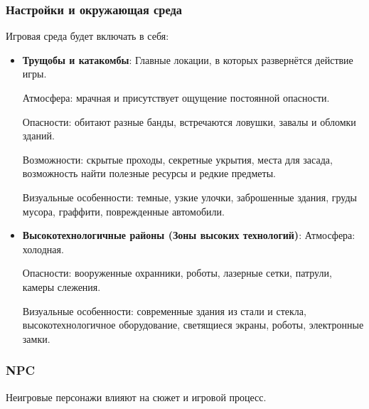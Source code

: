 \documentclass{article}
\begin{document}
\subsubsection{Настройки и окружающая среда}
Игровая среда будет включать в себя:
\begin{itemize}
    \item \textbf{Трущобы и катакомбы}: Главные локации, в которых развернётся действие игры. 
    
    Атмосфера: мрачная и присутствует ощущение постоянной опасности.

    Опасности: обитают разные банды, встречаются ловушки, завалы и обломки зданий.

    Возможности: скрытые проходы, секретные укрытия, места для засада, возможность найти полезные ресурсы и редкие предметы.

    Визуальные особенности: темные, узкие улочки, заброшенные здания, груды мусора, граффити, поврежденные автомобили.
    \item \textbf{Высокотехнологичные районы (Зоны высоких технологий)}:  
    Атмосфера: холодная. 

    Опасности: вооруженные охранники, роботы, лазерные сетки, патрули, камеры слежения.

    Визуальные особенности: современные здания из стали и стекла, высокотехнологичное оборудование, светящиеся экраны, роботы, электронные замки.
\end{itemize}
\subsubsection{NPC}

Неигровые персонажи влияют на сюжет и игровой процесс.
\end{document}
